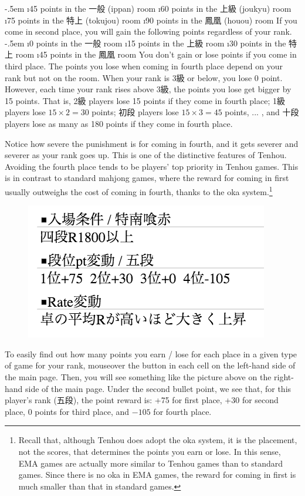 \bi \itemsep-.5em
	\i 45 points in the 一般 ({\jap ippan}) room
	\i 60 points in the 上級 ({\jap joukyu}) room
	\i 75 points in the 特上 ({\jap tokujou}) room
	\i 90 points in the 鳳凰 ({\jap houou}) room
\ei
If you come in second place, you will gain the following points regardless of your rank.
	\bi \itemsep-.5em
	\i 0 points in the 一般 room
	\i 15 points in the 上級 room
	\i 30 points in the 特上 room
	\i 45 points in the 鳳凰 room
\ei
You don't gain or lose points if you come in third place.
The points you lose when coming in fourth place depend on your rank but not on the room. When your rank is 3級 or below, you lose 0 point. However, each time your rank rises above 3級, the points you lose get bigger by 15 points.
That is, 2級 players lose 15 points if they come in fourth place; 1級 players lose $15 \times 2 = 30$ points; 初段 players lose $15 \times 3 = 45$ points, ... , and 十段 players lose as many as 180 points if they come in fourth place.

\bigskip
Notice how severe the punishment is for coming in fourth, and it gets severer and severer as your rank goes up. This is one of the distinctive features of {\jap Tenhou}.
Avoiding the fourth place tends to be players' top priority in {\jap Tenhou} games. This is in contrast to standard mahjong games, where the reward for coming in first usually outweighs the cost of coming in fourth, thanks to the {\jap oka} system.\footnote{Recall that, although {\jap Tenhou} does adopt the {\jap oka} system, it is the placement, not the scores, that determines the points you earn or lose. In this sense, EMA games are actually more similar to {\jap Tenhou} games than to standard games. Since there is no {\jap oka} in EMA games, the reward for coming in first is much smaller than that in standard games.} 

\bigskip

\begin{figure}
\vspace{-10pt}
\begin{center}
\includegraphics[width=.45\textwidth,clip]{figs/pt}
\end{center}
\vspace{-20pt}
\end{figure}
To easily find out how many points you earn / lose for each place in a given type of game for your rank, mouseover the  button in each cell on the left-hand side of the main page. Then, you will see something like the picture above on the right-hand side of the main page. Under the second bullet point, we see that, for this player's rank (五段), the point reward is: +75 for first place, +30 for second place, 0 points for third place, and $-105$ for fourth place.

